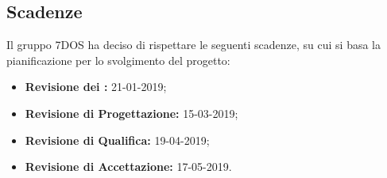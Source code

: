 \subsection{Scadenze}
Il gruppo 7DOS ha deciso di rispettare le seguenti scadenze, su cui si basa la pianificazione per lo svolgimento del progetto:
\begin{itemize}
	\item \textbf{Revisione dei :} 21-01-2019;
	\item \textbf{Revisione di Progettazione:} 15-03-2019;
	\item \textbf{Revisione di Qualifica:} 19-04-2019;
	\item \textbf{Revisione di Accettazione:} 17-05-2019.
\end{itemize}

\pagebreak

